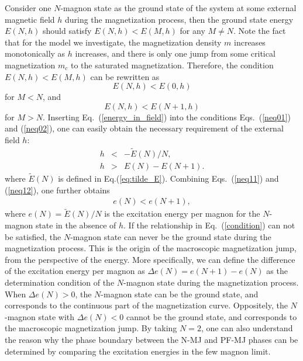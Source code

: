 \documentclass[article,10pt,onecolumn,superscriptaddress,floatfix]{revtex4}
\begin{document}
Consider one $N$-magnon state as the ground state of the system at some external magnetic field $h$ during the magnetization process, then the ground state energy $E(N,h)$ should satisfy $E(N,h) < E(M,h)$ for any $M \neq N$. Note the fact that for the model we investigate, the magnetization density $m$ increases monotonically as $h$ increases, and there is only one jump from some critical magnetization $m_c$ to the saturated magnetization. Therefore, the condition $E(N,h) < E(M,h)$ can be rewritten as
\begin{equation}
E(N,h) < E(0,h) \label{neq01}
\end{equation}
for $M < N$, and
\begin{equation}
E(N,h)<E(N+1,h) \label{neq02}
\end{equation}
for $M > N$. Inserting Eq.~(\ref{energy_in_field}) into the conditions Eqs.~(\ref{neq01}) and (\ref{neq02}), one can easily obtain the necessary requirement of the external field $h$:
\begin{eqnarray}
h&<&-\tilde{E}(N)/N, \label{neq11} \\
h&>&E(N)-E(N+1). \label{neq12}
\end{eqnarray}
where $\tilde{E}(N)$ is defined in Eq.(\ref{eq:tilde_E}).
Combining Eqs.~(\ref{neq11}) and (\ref{neq12}), one further obtains
\begin{eqnarray}
e(N)<e(N+1),
\label{condition}
\end{eqnarray}
where $e(N) = \tilde{E}(N)/N$ is the excitation energy per magnon for the $N$-magnon state in the absence of $h$.
If the relationship in Eq.~(\ref{condition}) can not be satisfied, the $N$-magnon state can never be the ground state during the magnetization process. This is the origin of the macroscopic magnetization jump, from the perspective of the energy. More specifically, we can define the difference of the excitation energy per magnon as $\Delta e(N)=e(N+1)-e(N)$ as the determination condition of the $N$-magnon state during the magnetization process. When $\Delta e(N)>0$, the $N$-magnon state can be the ground state, and corresponds to the continuous part of the magnetization curve. Oppositely, the $N$-magnon state with $\Delta e(N)<0$ cannot be the ground state, and corresponds to the macroscopic magnetization jump.  By taking $N=2$, one can also understand the reason why the phase boundary between the N-MJ and PF-MJ phases can be determined by comparing the excitation energies in the few magnon limit.
\end{document}
